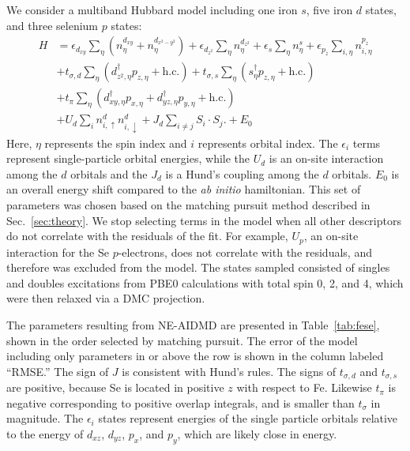 We consider a multiband Hubbard model including one iron $s$, five iron $d$ states, and three selenium $p$ states:
\begin{align*}
  H 
  &=
  \epsilon_{d_{xy}} \sum_{\eta} (n^{d_{xy}}_{\eta}  + n^{d_{x^2-y^2}}_{\eta})
  +
  \epsilon_{d_{z^2}} \sum_{\eta} n^{d_{z^2}}_{\eta} 
  +
  \epsilon_s \sum_{\eta} n^{s}_{\eta} 
  +
  \epsilon_{p_{z}} \sum_{i,\eta} n^{p_{z}}_{i,\eta} 
  \\
  &+ 
  t_{\sigma,d} \sum_{\eta} \left( d_{z^2,\eta}^{\dagger} p_{z,\eta} + \text{h.c.} \right)
  +
  t_{\sigma,s} \sum_{\eta} \left(s_{\eta}^{\dagger}  p_{z,\eta} + \text{h.c.} \right)
  \\
  &+ 
  t_{\pi} \sum_{\eta} \left( d_{xy,\eta}^{\dagger} p_{x,\eta} + d_{yz,\eta}^{\dagger}  p_{y,\eta} + \text{h.c.} \right)
  \\
  &+
  U_d \sum_{i} n^{d}_{i,\uparrow} n^{d}_{i,\downarrow} 
  +
  J_d \sum_{i\ne j} S_i \cdot S_j.
  +
  E_0
\end{align*}
Here, $\eta$ represents the spin index and $i$ represents orbital index.
The $\epsilon_i$ terms represent single-particle orbital energies, while the $U_d$ is an on-site interaction among the $d$ orbitals and the $J_d$ is a Hund's coupling among the $d$ orbitals.
$E_0$ is an overall energy shift compared to the \textit{ab initio} hamiltonian.
This set of parameters was chosen based on the matching pursuit method described in Sec.~\ref{sec:theory}.
We stop selecting terms in the model when all other descriptors do not correlate with the residuals of the fit.
For example, $U_p$, an on-site interaction for the Se $p$-electrons, does not correlate with the residuals, and therefore was excluded from the model.
The states sampled consisted of singles and doubles excitations from PBE0 calculations with total spin 0, 2, and 4, which were then relaxed via a DMC projection.

The parameters resulting from NE-AIDMD are presented in Table~\ref{tab:fese}, shown in the order selected by matching pursuit. 
The error of the model including only parameters in or above the row is shown in the column labeled ``RMSE.''
The sign of $J$ is consistent with Hund's rules. 
The signs of $t_{\sigma,d}$ and $t_{\sigma,s}$ are positive, because Se is located in positive $z$ with respect to Fe. 
Likewise $t_\pi$ is negative corresponding to positive overlap integrals, and is smaller than $t_\sigma$ in magnitude.
The $\epsilon_i$ states represent energies of the single particle orbitals relative to the energy of $d_{xz}$, $d_{yz}$, $p_x$, and $p_y$, which are likely close in energy.

